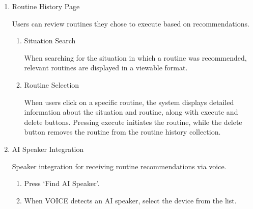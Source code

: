 \documentclass[conference]{IEEEtran}
\begin{document}
\begin{enumerate}[label=\arabic*]
\begin{enumerate}[label=\arabic*)]
        \vspace{0.5em}

        \item Routine History Page\par
        \vspace{0.3em}
        Users can review routines they chose to execute based on recommendations.
        \vspace{0.3em}

        \begin{enumerate}[label=\alph*)]
            \item Situation Search\par
            \vspace{0.3em}
            When searching for the situation in which a routine was recommended, relevant routines are displayed in a viewable format.

            \vspace{0.5em}

            \item Routine Selection\par
            \vspace{0.3em}
            When users click on a specific routine, the system displays detailed information about the situation and routine, along with execute and delete buttons. Pressing execute initiates the routine, while the delete button removes the routine from the routine history collection. 
        \end{enumerate}

        \vspace{0.5em}

        \item AI Speaker Integration\par
        \vspace{0.3em}
        Speaker integration for receiving routine recommendations via voice.
        \vspace{0.3em}

        \begin{enumerate}[label=\alph*)]
            \item Press ‘Find AI Speaker’.

            \vspace{0.5em}

            \item When VOICE detects an AI speaker, select the device from the list.


\end{enumerate}
\end{enumerate}
\end{enumerate}
\end{document}
